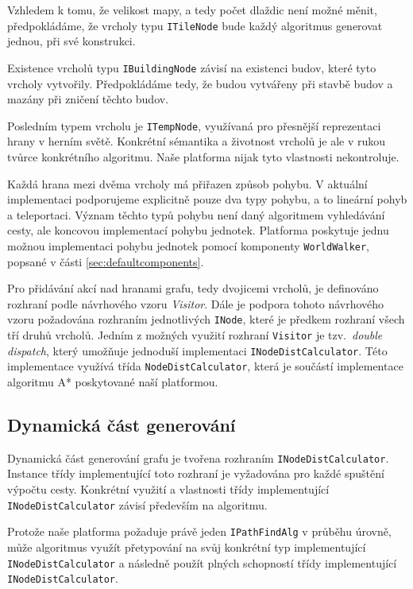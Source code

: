 Vzhledem k tomu, že velikost mapy, a tedy počet dlaždic není možné měnit, předpokládáme, že vrcholy typu \texttt{ITileNode} bude každý algoritmus generovat jednou, při své konstrukci. 

Existence vrcholů typu \texttt{IBuildingNode} závisí na existenci budov, které tyto vrcholy vytvořily. Předpokládáme tedy, že budou vytvářeny při stavbě budov a mazány při zničení těchto budov. 

Posledním typem vrcholu je \texttt{ITempNode}, využívaná pro přesnější reprezentaci hrany v herním světě. Konkrétní sémantika a životnost vrcholů je ale v rukou tvůrce konkrétního algoritmu. Naše platforma nijak tyto vlastnosti nekontroluje. 

Každá hrana mezi dvěma vrcholy má přiřazen způsob pohybu. V aktuální implementaci podporujeme explicitně pouze dva typy pohybu, a to lineární pohyb a teleportaci. Význam těchto typů pohybu není daný algoritmem vyhledávání cesty, ale koncovou implementací pohybu jednotek. Platforma poskytuje jednu možnou implementaci pohybu jednotek pomocí komponenty \texttt{WorldWalker}, popsané v části \ref{sec:defaultcomponents}.

Pro přidávání akcí nad hranami grafu, tedy dvojicemi vrcholů, je definováno rozhraní podle návrhového vzoru \textit{Visitor}. Dále je podpora tohoto návrhového vzoru požadována rozhraním jednotlivých \texttt{INode}, které je předkem rozhraní všech tří druhů vrcholů. Jedním z možných využití rozhraní \texttt{Visitor} je tzv.~\textit{double dispatch}, který umožňuje jednoduší implementaci \texttt{INodeDistCalculator}. Této implementace využívá třída \texttt{NodeDistCalculator}, která je součástí implementace algoritmu A* poskytované naší platformou.

\subsection{Dynamická část generování}
Dynamická část generování grafu je tvořena rozhraním \texttt{INodeDistCalculator}. Instance třídy implementující toto rozhraní je vyžadována pro každé spuštění výpočtu cesty. Konkrétní využití a vlastnosti třídy implementující \texttt{INodeDistCalculator} závisí především na algoritmu. 

Protože naše platforma požaduje právě jeden 
\texttt{IPathFindAlg} v průběhu úrovně, může algoritmus využít přetypování na svůj konkrétní typ implementující \texttt{INodeDistCalculator} a následně použít plných schopností třídy implementující \texttt{INodeDistCalculator}. 


